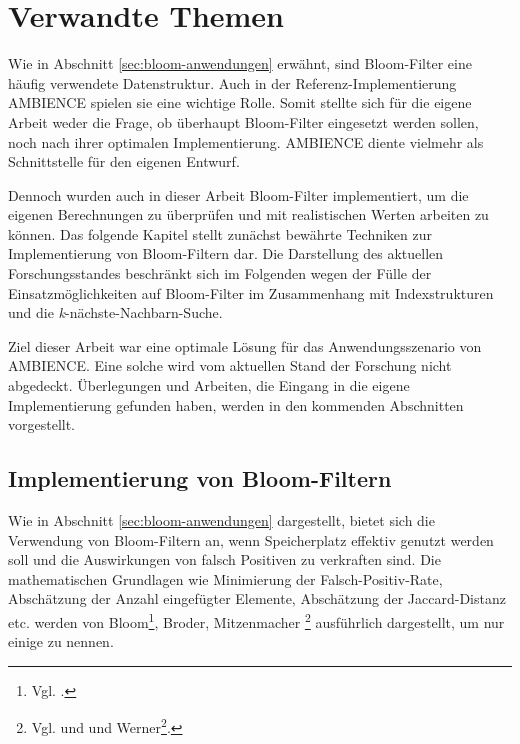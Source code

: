 \chapter{Verwandte Themen}\label{ch:related}
Wie in Abschnitt \ref{sec:bloom-anwendungen} erwähnt, sind Bloom-Filter eine häufig verwendete Datenstruktur. Auch in der Referenz-Implementier\-ung AMBIENCE spielen sie eine wichtige Rolle. Somit stellte sich für die eigene Arbeit weder die Frage, ob überhaupt Bloom-Filter eingesetzt werden sollen, noch nach ihrer optimalen Implementierung. AMBIENCE diente vielmehr als Schnittstelle für den eigenen Entwurf. 

Dennoch wurden auch in dieser Arbeit Bloom-Filter implementiert, um die eigenen Berechnungen zu überprüfen und mit realistischen Werten arbeiten zu können. Das folgende Kapitel stellt zunächst bewährte Techniken zur Implementierung von Bloom-Filtern dar. Die Darstellung des aktuellen Forschungsstandes beschränkt sich im Folgenden wegen der Fülle der Einsatzmöglichkeiten auf Bloom-Filter im Zusammenhang mit Indexstrukturen und die \textit{k}-nächste-Nachbarn-Suche. 

Ziel dieser Arbeit war eine optimale Lösung für das Anwendungsszenario von AMBIENCE. Eine solche wird vom aktuellen Stand der Forschung nicht abgedeckt. Überlegungen und Arbeiten, die Eingang in die eigene Implementierung gefunden haben, werden in den kommenden Abschnitten vorgestellt. 
\section{Implementierung von Bloom-Filtern}\label{sec:bloom-implementierung}
Wie in Abschnitt \ref{sec:bloom-anwendungen} dargestellt, bietet sich die Verwendung von Bloom-Filtern an, wenn Speicherplatz effektiv genutzt werden soll und die Auswirkungen von falsch Positiven zu verkraften sind. Die mathematischen Grundlagen wie Minimierung der Falsch-Positiv-Rate, Abschätzung der Anzahl eingefügter Elemente, Abschätzung der Jaccard-Distanz etc. werden von Bloom\footnote{Vgl. \cite{Bloom1970}.}, Broder, Mitzenmacher \footnote{Vgl. \cite{Broder2004} und \cite{Mitzenmacher2002} und Werner\footnote{Vgl. \cite{Werner2015}.}.} ausführlich dargestellt, um nur einige zu nennen. 

